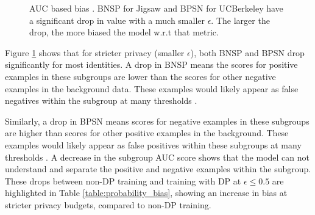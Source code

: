 \documentclass[11pt]{article} %
\begin{document}
\begin{figure}[!htb]
    \caption{AUC based bias \cite{borkan2019nuanced}. BNSP for Jigsaw and BPSN for UCBerkeley have a significant drop in value with a much smaller $\epsilon$. The larger the drop, the more biased the model w.r.t that metric.}
    \label{figure:probability_bias}
\end{figure}

Figure \ref{figure:probability_bias} shows that for stricter privacy (smaller $\epsilon$),  both BNSP and BPSN drop significantly for most identities. A drop in BNSP means the scores for positive examples in these subgroups are lower than the scores for other negative examples in the background data. These examples would likely appear as false negatives within the subgroup at many thresholds \cite{borkan2019nuanced}. 

Similarly, a drop in BPSN means scores for negative examples in these subgroups are higher than scores for other positive examples in the background. These examples would likely appear as false positives within these subgroups at many thresholds \cite{borkan2019nuanced}. A decrease in the subgroup AUC score shows that the model can not understand and separate the positive and negative examples within the subgroup. These drops between non-DP training and training with DP at $\epsilon \le 0.5$ are highlighted in Table \ref{table:probability_bias}, showing an increase in bias at stricter privacy budgets, compared to non-DP training.
\end{document}
